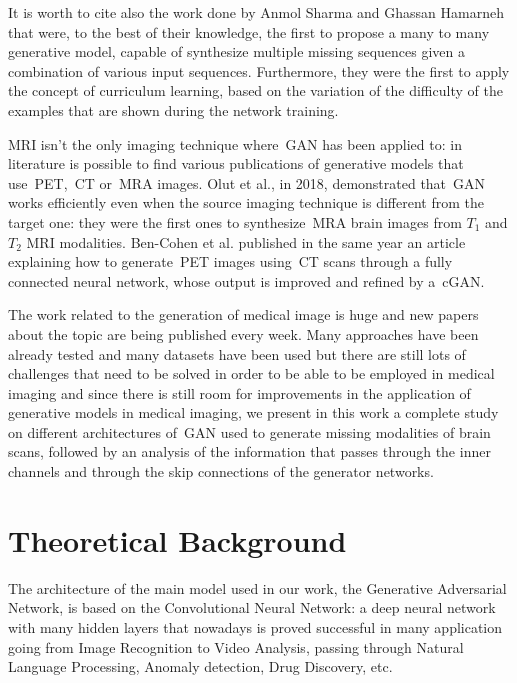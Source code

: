 \vspace{5mm} %
It is worth to cite also the work done by Anmol Sharma and Ghassan Hamarneh that were, to the best of their knowledge\cite{migan}, the first to propose a many to many generative model, capable of synthesize multiple missing sequences given a combination of various input sequences. Furthermore, they were the first to apply the concept of curriculum learning, based on the variation of the difficulty of the examples that are shown during the network training.

\vspace{5mm} %
MRI isn't the only imaging technique where~\ac{GAN} has been applied to: in literature is possible to find various publications of generative models that use~\ac{PET},~\ac{CT} or~\ac{MRA} images. 
Olut et al., in 2018, demonstrated that~\ac{GAN} works efficiently even when the source imaging technique is different from the target one: they were the first ones to synthesize~\ac{MRA} brain images from $T_1$ and $T_2$ MRI modalities\cite{mra&mri}. Ben-Cohen et al. published in the same year an article\cite{ct&pet} explaining how to generate~\ac{PET} images using~\ac{CT} scans through a fully connected neural network, whose output is improved and refined by a~\ac{cGAN}\cite{cgan}.


\vspace{5mm} %
The work related to the generation of medical image is huge and new papers about the topic are being published every week. Many approaches have been already tested and many datasets have been used but there are still lots of challenges that need to be solved in order to be able to be employed in medical imaging\cite{Yi_2019} and since there is still room for improvements in the application of generative models in medical imaging, we present in this work a complete study on different architectures of~\ac{GAN} used to generate missing modalities of brain scans, followed by an analysis of the information that passes through the inner channels and through the skip connections of the generator networks.


\section{Theoretical Background}
\label{sec:theoretical_background}
The architecture of the main model used in our work, the Generative Adversarial Network, is based on the Convolutional Neural Network: a deep neural network with many hidden layers that nowadays is proved successful in many application going from Image Recognition to Video Analysis, passing through Natural Language Processing, Anomaly detection, Drug Discovery, etc.

